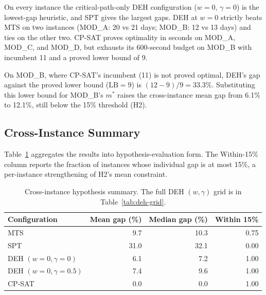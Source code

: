 \documentclass[conference]{IEEEtran}
\begin{document}
On every instance the critical-path-only DEH configuration
($w = 0$, $\gamma = 0$) is the lowest-gap heuristic, and SPT gives
the largest gaps. DEH at $w = 0$ strictly beats MTS on two instances
(MOD\_A: 20 vs 21 days; MOD\_B: 12 vs 13 days) and ties on the other
two. CP-SAT proves optimality in seconds on MOD\_A, MOD\_C, and
MOD\_D, but exhausts its 600-second budget on MOD\_B with incumbent
11 and a proved lower bound of 9.

On MOD\_B, where CP-SAT's incumbent (11) is not proved optimal,
DEH's gap against the proved lower bound ($\text{LB} = 9$) is
$(12 - 9)/9 = 33.3\%$. Substituting this lower bound for MOD\_B's
$m^{*}$ raises the cross-instance mean gap from 6.1\% to 12.1\%,
still below the 15\% threshold (H2).

\subsection{Cross-Instance Summary}
\label{sec:cross-instance}

Table~\ref{tab:h1summary} aggregates the results into
hypothesis-evaluation form. The Within-15\% column reports the
fraction of instances whose individual gap is at most 15\%, a
per-instance strengthening of H2's mean constraint.

\begin{table}[ht]
\caption{Cross-instance hypothesis summary. The full DEH
$(w, \gamma)$ grid is in Table~\ref{tab:deh-grid}.}
\label{tab:h1summary}
\centering
\renewcommand{\arraystretch}{1.15}
\setlength{\tabcolsep}{4pt}
\begin{tabular}{@{}lrrr@{}}
\toprule
Configuration                         & Mean gap (\%) & Median gap (\%) & Within 15\% \\
\midrule
MTS                                 &  9.7 & 10.3 & 0.75 \\
SPT                                 & 31.0 & 32.1 & 0.00 \\
DEH $(w{=}0, \gamma{=}0)$           &  6.1 &  7.2 & 1.00 \\
DEH $(w{=}0, \gamma{=}0.5)$         &  7.4 &  9.6 & 1.00 \\
CP-SAT                               &  0.0 &  0.0 & 1.00 \\
\bottomrule
\end{tabular}
\end{table}
\end{document}
